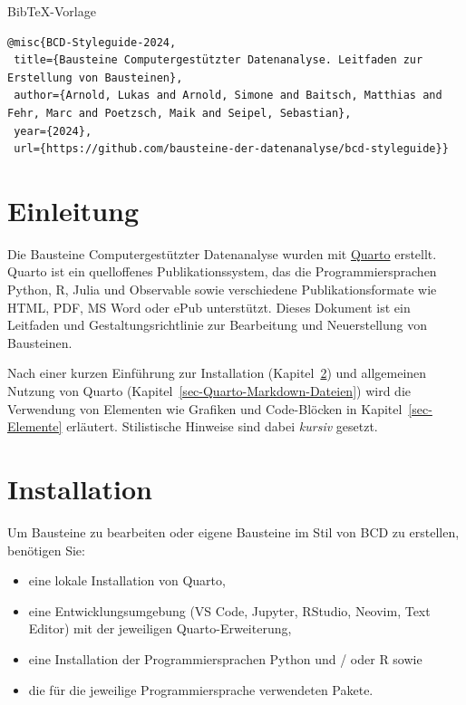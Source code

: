 \documentclass[
  letterpaper,
  DIV=11]{scrartcl}
\providecommand{\tightlist}{%
  \setlength{\itemsep}{0pt}\setlength{\parskip}{0pt}}\usepackage{longtable,booktabs,array}
\begin{document}
BibTeX-Vorlage

\begin{verbatim}
@misc{BCD-Styleguide-2024,
 title={Bausteine Computergestützter Datenanalyse. Leitfaden zur Erstellung von Bausteinen},
 author={Arnold, Lukas and Arnold, Simone and Baitsch, Matthias and Fehr, Marc and Poetzsch, Maik and Seipel, Sebastian},
 year={2024},
 url={https://github.com/bausteine-der-datenanalyse/bcd-styleguide}} 
\end{verbatim}

\newpage{}

\section{Einleitung}\label{einleitung}

Die Bausteine Computergestützter Datenanalyse wurden mit
\href{https://quarto.org/}{Quarto} erstellt. Quarto ist ein quelloffenes
Publikationssystem, das die Programmiersprachen Python, R, Julia und
Observable sowie verschiedene Publikationsformate wie HTML, PDF, MS Word
oder ePub unterstützt. Dieses Dokument ist ein Leitfaden und
Gestaltungsrichtlinie zur Bearbeitung und Neuerstellung von Bausteinen.

Nach einer kurzen Einführung zur Installation
(Kapitel~\ref{sec-Installation}) und allgemeinen Nutzung von Quarto
(Kapitel~\ref{sec-Quarto-Markdown-Dateien}) wird die Verwendung von
Elementen wie Grafiken und Code-Blöcken in Kapitel~\ref{sec-Elemente}
erläutert. Stilistische Hinweise sind dabei \emph{kursiv} gesetzt.

\section{Installation}\label{sec-Installation}

Um Bausteine zu bearbeiten oder eigene Bausteine im Stil von BCD zu
erstellen, benötigen Sie:

\begin{itemize}
\tightlist
\item
  eine lokale Installation von Quarto,
\item
  eine Entwicklungsumgebung (VS Code, Jupyter, RStudio, Neovim, Text
  Editor) mit der jeweiligen Quarto-Erweiterung,
\item
  eine Installation der Programmiersprachen Python und / oder R sowie
\item
  die für die jeweilige Programmiersprache verwendeten Pakete.
\end{itemize}
\end{document}
